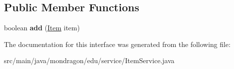\subsection*{Public Member Functions}
\begin{DoxyCompactItemize}
\item 
\mbox{\label{interfacemondragon_1_1edu_1_1service_1_1_item_service_a2aceb833f236be4148e629507cea74a7}} 
boolean {\bfseries add} (\mbox{\hyperlink{classmondragon_1_1edu_1_1clases_1_1_item}{Item}} item)
\end{DoxyCompactItemize}


The documentation for this interface was generated from the following file\+:\begin{DoxyCompactItemize}
\item 
src/main/java/mondragon/edu/service/Item\+Service.\+java\end{DoxyCompactItemize}
